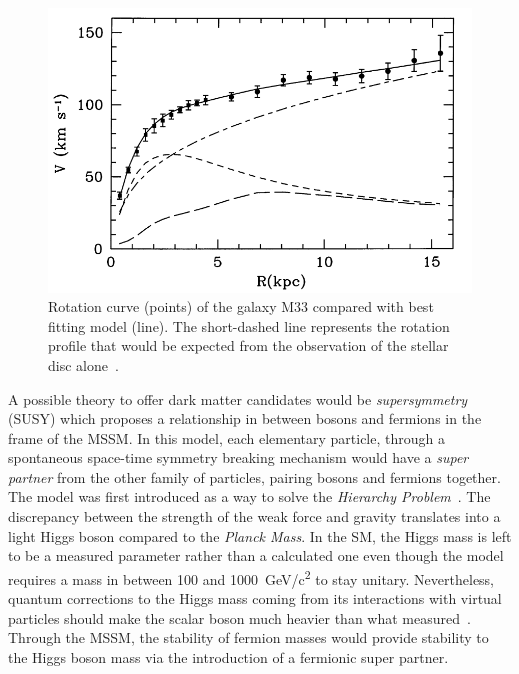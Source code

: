 	\begin{figure}[H]
		\centering
		\includegraphics[width=0.7\plotwidth]{fig/chapt2/M33-rotation-curve.png}
		\caption{\label{fig:galaxy} Rotation curve (points) of the galaxy M33 compared with best fitting model (line). The short-dashed line represents the rotation profile that would be expected from the observation of the stellar disc alone~\cite{CORBELLI2000}.}
	\end{figure}
	
	A possible theory to offer dark matter candidates would be \textit{supersymmetry} (SUSY) which proposes a relationship in between bosons and fermions in the frame of the \acf{MSSM}. In this model, each elementary particle, through a spontaneous space-time symmetry breaking mechanism would have a \textit{super partner} from the other family of particles, pairing bosons and fermions together. The model was first introduced as a way to solve the \textit{Hierarchy Problem}~\cite{DIMOPOULOS1981}. The discrepancy between the strength of the weak force and gravity translates into a light Higgs boson compared to the \textit{Planck Mass}. In the SM, the Higgs mass is left to be a measured parameter rather than a calculated one even though the model requires a mass in between 100 and \SI{1000}{GeV/c^2} to stay unitary. Nevertheless, quantum corrections to the Higgs mass coming from its interactions with virtual particles should make the scalar boson much heavier than what measured~\cite{TANEDO2012}. Through the MSSM, the stability of fermion masses would provide stability to the Higgs boson mass via the introduction of a fermionic super partner.
	
